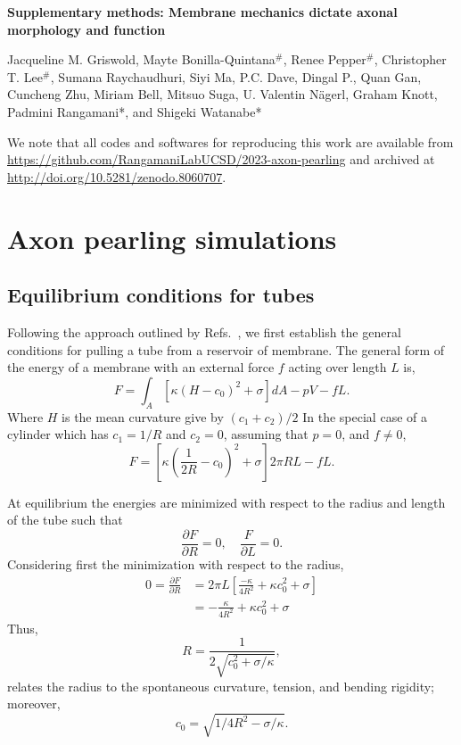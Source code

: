 \documentclass[11pt]{article}
\begin{document}
\begin{centering}
    \textbf{\Large Supplementary methods: Membrane mechanics dictate axonal morphology and function}

    Jacqueline M. Griswold,  Mayte Bonilla\hyphen Quintana\(^{\#}\), Renee Pepper\(^{\#}\), Christopher T. Lee\(^{\#}\), Sumana Raychaudhuri, Siyi Ma, P.C. Dave, Dingal P., Quan Gan, Cuncheng Zhu, Miriam Bell,  Mitsuo Suga, U. Valentin Nägerl, Graham Knott,  Padmini Rangamani*, and Shigeki Watanabe*\\[1cm]
\end{centering}

\noindent We note that all codes and softwares for reproducing this work are available from \url{https://github.com/RangamaniLabUCSD/2023-axon-pearling} and archived at \url{http://doi.org/10.5281/zenodo.8060707}.

\section{Axon pearling simulations}
\subsection{Equilibrium conditions for tubes}
Following the approach outlined by Refs.~\cite{DerenyiEtAl2002,ShurerEtAl2019}, we first establish the general conditions for pulling a tube from a reservoir of membrane.
The general form of the energy of a membrane with an external force \(f\) acting over length \(L\) is,
\begin{equation}
    F = \int_A \left[\kappa(H - c_0)^2 + \sigma \right]dA - pV - fL.
\end{equation}
Where \(H\) is the mean curvature give by \((c_1 + c_2)/2\)
In the special case of a cylinder which has \(c_1 = 1/R\) and \(c_2 = 0\), assuming that \(p=0\), and \(f\neq 0\),
\begin{equation}
    F = \left[ \kappa\left(\frac{1}{2R} - c_0\right)^2 + \sigma\right] 2\pi RL - fL.
\end{equation}

At equilibrium the energies are minimized with respect to the radius and length of the tube such that
\begin{equation}
    \frac{\partial F}{\partial R} = 0,\quad \frac{F}{\partial L} =0.
\end{equation}
Considering first the minimization with respect to the radius,
\begin{align*}
    0 = \frac{\partial F}{\partial R} & = 2\pi L\left[\frac{-\kappa}{4R^2} + \kappa c_0^2 + \sigma\right] \\
                                      & = - \frac{\kappa}{4R^2} + \kappa c_0^2 + \sigma
\end{align*}
Thus,
\begin{equation}
    R = \frac{1}{2\sqrt{c_0^2 + \sigma/\kappa}},
\end{equation}
relates the radius to the spontaneous curvature, tension, and bending rigidity; moreover,
\begin{equation}
    c_0 = \sqrt{1/4R^2 - \sigma/\kappa}.
    \label{eq:spontaneous_curvature_relation}
\end{equation}
\end{document}
